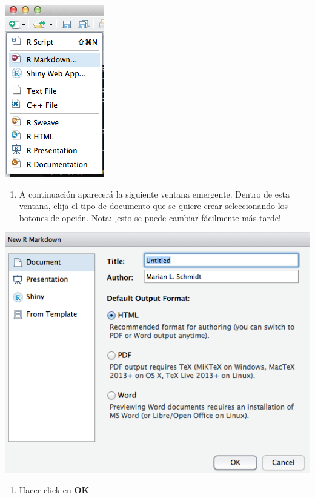\documentclass[
]{book}
\providecommand{\tightlist}{%
  \setlength{\itemsep}{0pt}\setlength{\parskip}{0pt}}
\begin{document}
\includegraphics{figures/rmarkdown_1.png}

\begin{enumerate}
\def\labelenumi{\arabic{enumi}.}
\setcounter{enumi}{1}
\tightlist
\item
  A continuación aparecerá la siguiente ventana emergente. Dentro de esta ventana, elija el tipo de documento que se quiere crear seleccionando los botones de opción. Nota: ¡esto se puede cambiar fácilmente más tarde!
\end{enumerate}

\includegraphics{figures/rmarkdown_2.png}

\begin{enumerate}
\def\labelenumi{\arabic{enumi}.}
\setcounter{enumi}{2}
\tightlist
\item
  Hacer click en \textbf{OK}
\end{enumerate}
\end{document}
